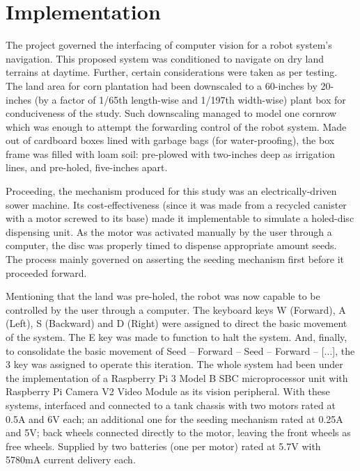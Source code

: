 \section{Implementation}

	The project governed the interfacing of computer vision for a robot system’s navigation. This proposed system was conditioned to navigate on dry land terrains at daytime. Further, certain considerations were taken as per testing. The land area for corn plantation had been downscaled to a 60-inches by 20-inches (by a factor of 1/65th length-wise and 1/197th width-wise) plant box for conduciveness of the study. Such downscaling managed to model one cornrow which was enough to attempt the forwarding control of the robot system. Made out of cardboard boxes lined with garbage bags (for water-proofing), the box frame was filled with loam soil: pre-plowed with two-inches deep as irrigation lines, and pre-holed, five-inches apart.
	
	Proceeding, the mechanism produced for this study was an electrically-driven sower machine. Its cost-effectiveness (since it was made from a recycled canister with a motor screwed to its base) made it implementable to simulate a holed-disc dispensing unit. As the motor was activated manually by the user through a computer, the disc was properly timed to dispense appropriate amount seeds. The process mainly governed on asserting the seeding mechanism first before it proceeded forward.
	
	Mentioning that the land was pre-holed, the robot was now capable to be controlled by the user through a computer. The keyboard keys W (Forward), A (Left), S (Backward) and D (Right) were assigned to direct the basic movement of the system. The E key was made to function to halt the system. And, finally, to consolidate the basic movement of Seed – Forward – Seed – Forward – [...], the 3 key was assigned to operate this iteration. The whole system had been under the implementation of a Raspberry Pi 3 Model B SBC microprocessor unit with Raspberry Pi Camera V2 Video Module as its vision peripheral. With these systems, interfaced and connected to a tank chassis with two motors rated at 0.5A and 6V each; an additional one for the seeding mechanism rated at 0.25A and 5V; back wheels connected directly to the motor, leaving the front wheels as free wheels. Supplied by two batteries (one per motor) rated at 5.7V with 5780mA current delivery each.

	
